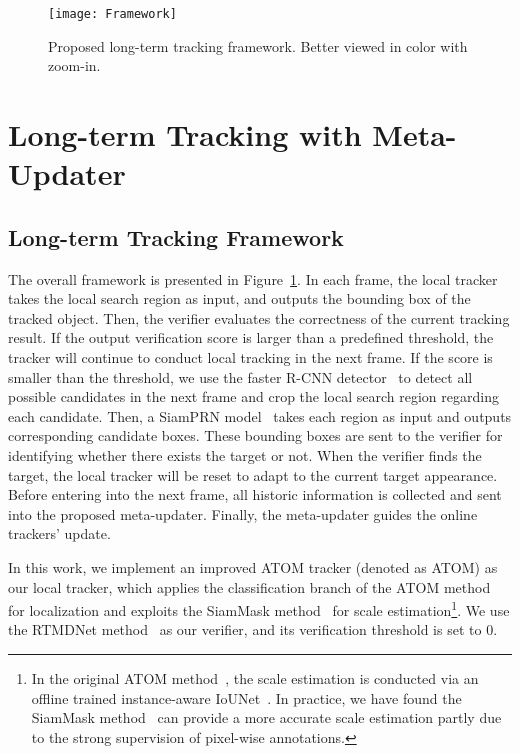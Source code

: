 \documentclass[10pt,twocolumn,letterpaper]{article}
\begin{document}
\begin{figure}[h]
	\begin{center}
		\texttt{[image: Framework]}
	\end{center}
	\vspace{-4mm}
	\caption{Proposed long-term tracking framework. Better viewed in color with zoom-in.}
	\label{fig:framework}
	\vspace{-6mm}
\end{figure}
\section{Long-term Tracking with Meta-Updater}
\vspace{-2mm}
\subsection{Long-term Tracking Framework}
\vspace{-2mm}
The overall framework is presented in Figure~\ref{fig:framework}.
In each frame, the local tracker takes the local search region as input, and outputs
the bounding box of the tracked object.
Then, the verifier evaluates the correctness of the current tracking result.
If the output verification score is larger than a predefined threshold, the tracker will continue to
conduct local tracking in the next frame.
If the score is smaller than the threshold, we use the faster R-CNN detector~\cite{mmdetection} to
detect all possible candidates in the next frame and crop the local search region regarding each candidate.
Then, a SiamPRN model~\cite{Zhang-VOT18-MBMD} takes each region as input and outputs corresponding candidate boxes.
These bounding boxes are sent to the verifier for identifying whether there exists the target or not.
When the verifier finds the target, the local tracker will be reset to adapt to the current target appearance.
Before entering into the next frame, all historic information is collected and sent into the proposed
meta-updater.
Finally, the meta-updater guides the online trackers' update.

In this work, we implement an improved ATOM tracker (denoted as ATOM)
as our local tracker, which applies the classification branch of the
ATOM method~\cite{Danelljan-CVPR19-ATOM}  for localization and exploits
the SiamMask method~\cite{Wang-CVPR19-SiamMask} for scale
estimation\footnote{In the original ATOM method~\cite{Danelljan-CVPR19-ATOM},
the scale estimation is conducted via an offline trained instance-aware
IoUNet~\cite{Jiang-ECCV18-IoUNet}. In practice, we have found the SiamMask
method~\cite{Wang-CVPR19-SiamMask} can provide a more accurate scale
estimation partly due to the strong supervision of pixel-wise annotations.}.
We use the RTMDNet method~\cite{RTMDNet} as our verifier, and its verification
threshold is set to 0.
\end{document}
